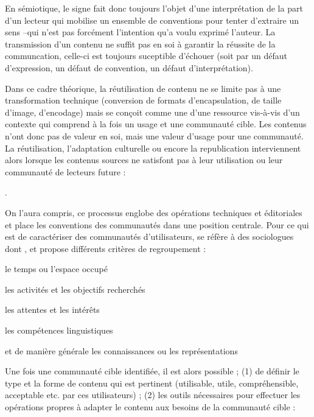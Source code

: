 En sémiotique, le signe fait donc toujours l'objet d'une interprétation de la part d'un lecteur qui mobilise un ensemble de conventions pour tenter d'extraire un sens --qui n'est pas forcément l'intention qu'a voulu exprimé l'auteur.
La transmission d'un contenu ne suffit pas en soi à garantir la réussite de la communcation, celle-ci est toujours suceptible d'échouer (soit par un défaut d'expression, un défaut de convention, un défaut d'interprétation). 

Dans ce cadre théorique, la réutilisation de contenu ne se limite pas à une transformation technique (conversion de formats d'encapsulation, de taille d'image, d'encodage) mais se conçoit comme une  \parencite{Stockinger2007} d'une ressource vis-à-vis d'un contexte qui comprend à la fois un usage et une communauté cible. 
Les contenus n'ont donc pas de valeur en soi, mais une valeur d'usage pour une communauté. 
La réutilisation, l'adaptation culturelle ou encore la republication interviennent alors lorsque les contenus sources ne satisfont pas à leur utilisation ou leur communauté de lecteurs future : 

 \parencite{Stockinger2007b}.


On l'aura compris, ce processus englobe des opérations techniques et éditoriales et place les conventions des communautés dans une position centrale. 
Pour ce qui est de caractériser des communautés d'utilisateurs,  se réfère à des sociologues dont \cite{Bourdieu}, et propose différents critères de regroupement :
\begin{liste}
	\item le temps ou l'espace occupé
	\item les activités et les objectifs recherchés
	\item les attentes et les intérêts
	\item les compétences linguistiques
	\item et de manière générale les connaissances ou les représentations
\end{liste}

Une fois une communauté cible identifiée, il est alors possible ; (1) de définir le type et la forme de contenu qui est pertinent (utilisable, utile, compréhensible, acceptable etc. par ces utilisateurs) ; (2) les outils nécessaires pour effectuer les opérations propres à adapter le contenu aux besoins de la communauté cible :

